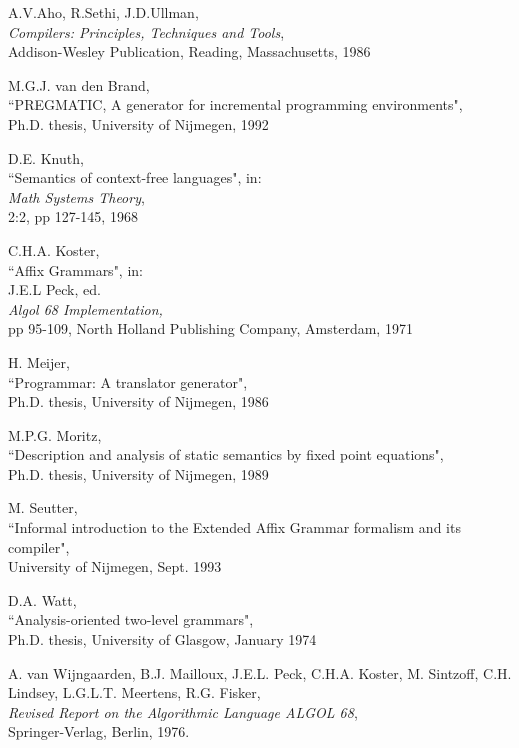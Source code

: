
\begin{thebibliography}{MMM88}

{A.V.Aho, R.Sethi, J.D.Ullman,\\
{\it Compilers: Principles, Techniques and Tools},\\
Addison-Wesley Publication, Reading, Massachusetts, 1986}

{M.G.J. van den Brand,\\
``PREGMATIC, A generator for incremental programming environments",\\
Ph.D. thesis, University of Nijmegen, 1992}

{D.E. Knuth,\\
``Semantics of context-free languages", in:\\
{\it Math Systems Theory},\\
2:2, pp 127-145, 1968}

{C.H.A. Koster,\\
``Affix Grammars", in:\\
J.E.L Peck, ed.\\
{\it Algol 68 Implementation,}\\
pp 95-109, North Holland Publishing Company, Amsterdam, 1971}

{H. Meijer,\\
``Programmar: A translator generator",\\
Ph.D. thesis, University of Nijmegen, 1986}

{M.P.G. Moritz,\\
``Description and analysis of static semantics by fixed point equations",\\
Ph.D. thesis, University of Nijmegen, 1989}

{M. Seutter,\\
``Informal introduction to the Extended Affix Grammar formalism
and its compiler",\\
University of Nijmegen, Sept. 1993}

{D.A. Watt, \\
``Analysis-oriented two-level grammars",\\
Ph.D. thesis, University of Glasgow, January 1974}

{A. van Wijngaarden, B.J. Mailloux, J.E.L. Peck,
C.H.A. Koster, M. Sintzoff, C.H. Lindsey,
L.G.L.T. Meertens, R.G. Fisker,\\
{\it Revised Report on the Algorithmic Language ALGOL 68},\\
Springer-Verlag, Berlin, 1976.}

\end{thebibliography}
